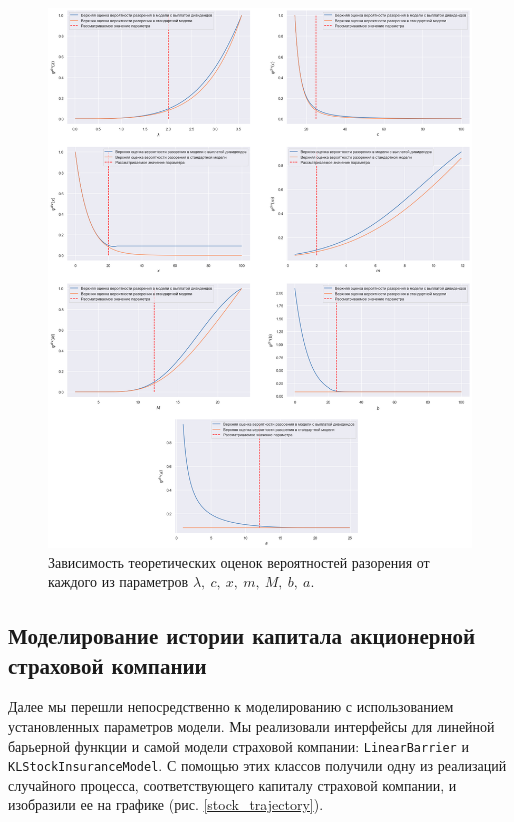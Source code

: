 \documentclass{article}
\theoremstyle{plain}
\theoremstyle{plain}
\theoremstyle{plain}
\theoremstyle{plain}
\theoremstyle{definition}
\theoremstyle{remark}
\begin{document}
\begin{figure}[h]
\centering
\includegraphics[scale=0.4]{images/params_relation_1.png}
\captionsetup{justification=centering}
\caption{Зависимость теоретических оценок вероятностей разорения от каждого из параметров $\lambda,\ c,\ x,\ m,\ M,\ b,\ a$.}
\label{prob_to_params_relation_1}
\end{figure}

\clearpage

\subsection{Моделирование истории капитала акционерной страховой компании}

Далее мы перешли непосредственно к моделированию с использованием установленных параметров модели. Мы реализовали интерфейсы для линейной барьерной функции и самой модели страховой компании: \texttt{LinearBarrier} и \\
\texttt{KLStockInsuranceModel}. С помощью этих классов получили одну из реализаций случайного процесса, соответствующего капиталу страховой компании, и изобразили ее на графике (рис. \ref{stock_trajectory}).
\end{document}
